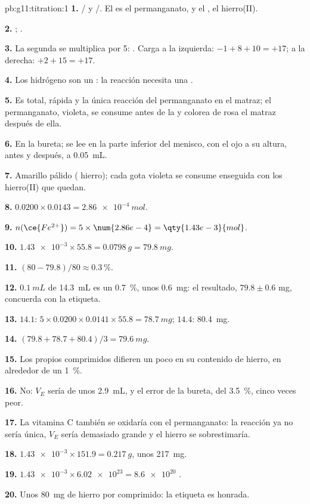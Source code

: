\begin{solution}{pb:g11:titration:1}
\textbf{1.} / y /. El
 es el  permanganato, y el , el  hierro(II).

\textbf{2.} ;
.

\textbf{3.} La segunda se multiplica por 5:
. Carga a la
izquierda: $-1 + 8 + 10 = +17$; a la derecha: $+2 + 15 = +17$.

\textbf{4.} Los  hidrógeno son un : la reacción necesita
una .

\textbf{5.} Es total, rápida y la única reacción del permanganato en el
matraz; el permanganato, violeta, se consume antes de la  y
colorea de rosa el matraz después de ella.

\textbf{6.} En la bureta; se lee en la parte inferior del menisco, con
el ojo a su altura, antes y después, a \qty{0.05}{mL}.

\textbf{7.} Amarillo pálido ( hierro); cada gota violeta se
consume enseguida con los  hierro(II) que quedan.

\textbf{8.} $0.0200 \times 0.0143 = \qty{2.86e-4}{mol}$.

\textbf{9.} $n(\ce{Fe^{2+}}) = 5 \times \num{2.86e-4} =
\qty{1.43e-3}{mol}$.

\textbf{10.} $\num{1.43e-3} \times 55.8 = \qty{0.0798}{g} =
\qty{79.8}{mg}$.

\textbf{11.} $(80 - 79.8)/80 \approx \qty{0.3}{\percent}$.

\textbf{12.} $\qty{0.1}{mL}$ de \qty{14.3}{mL} es un \qty{0.7}{\percent},
unos \qty{0.6}{mg}: el resultado, $79.8 \pm 0.6$ mg, concuerda con la
etiqueta.

\textbf{13.} $14.1$: $5 \times 0.0200 \times 0.0141 \times 55.8 =
\qty{78.7}{mg}$; $14.4$: \qty{80.4}{mg}.

\textbf{14.} $(79.8 + 78.7 + 80.4)/3 = \qty{79.6}{mg}$.

\textbf{15.} Los propios comprimidos difieren un poco en su contenido de
hierro, en alrededor de un \qty{1}{\percent}.

\textbf{16.} No: $V_E$ sería de unos \qty{2.9}{mL}, y el error de la
bureta, del \qty{3.5}{\percent}, cinco veces peor.

\textbf{17.} La vitamina C también se oxidaría con el permanganato: la
reacción ya no sería única, $V_E$ sería demasiado grande y el hierro se
sobrestimaría.

\textbf{18.} $\num{1.43e-3} \times 151.9 = \qty{0.217}{g}$, unos
\qty{217}{mg}.

\textbf{19.} $\num{1.43e-3} \times \num{6.02e23} = \num{8.6e20}$ .

\textbf{20.} Unos \qty{80}{mg} de hierro por comprimido: la etiqueta es
honrada.
\end{solution}
